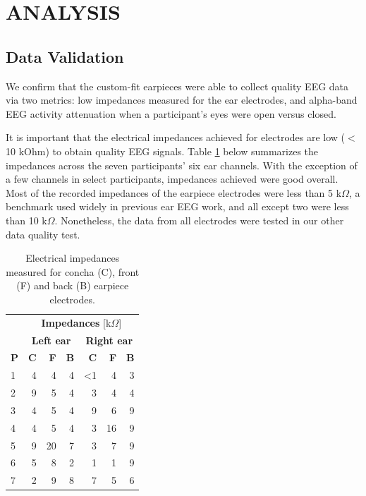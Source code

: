 \documentclass[a4paper,twoside]{article}
\begin{document}
\section{\uppercase{Analysis}}
\label{sec:analysis}

\subsection{Data Validation}

\noindent We confirm that the custom-fit earpieces were able to collect quality EEG data via two metrics: low impedances measured for the ear electrodes, and alpha-band EEG activity attenuation when a participant's eyes were open versus closed.

It is important that the electrical impedances achieved for electrodes are low ($<$10 kOhm) to obtain quality EEG signals. Table \ref{tab:impedances} below summarizes the impedances across the seven participants' six ear channels. With the exception of a few channels in select participants, impedances achieved were good overall. Most of the recorded impedances of the earpiece electrodes were less than 5 k\(\Omega\), a benchmark used widely in previous ear EEG work, and all except two were less than 10 k\(\Omega\). Nonetheless, the data from all electrodes were tested in our other data quality test.

\begin{table}
\caption{Electrical impedances measured for concha (C), front (F) and back (B) earpiece electrodes.}
\label{tab:impedances}
\begin{center}
\begin{tabular}{lrrrrrr}
& \multicolumn{6}{c}{\textbf{Impedances} [k\(\Omega\)]} \\
\cline{2-7}
& \multicolumn{3}{|c|}{\textbf{Left ear}} & \multicolumn{3}{c|}{\textbf{Right ear}} \\
\textbf{P} & \textbf{C} & \textbf{F} & \textbf{B} & \textbf{C} & \textbf{F} & \textbf{B} \\
\hline
1 & 4 & 4 & 4 & \textless1 & 4 & 3\\
2 & 9 & 5 & 4 & 3 & 4 & 4\\
3 & 4 & 5 & 4 & 9 & 6 & 9\\
4 & 4 & 5 & 4 & 3 & 16 & 9\\
5 & 9 & 20 & 7 & 3 & 7 & 9\\
6 & 5 & 8 & 2 & 1 & 1 & 9\\
7 & 2 & 9 & 8 & 7 & 5 & 6\\
\hline
\end{tabular}
\end{center}
\end{table}
\end{document}
